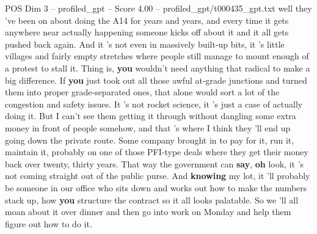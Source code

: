 \begin{textsample}{POS Dim 3 – profiled\_gpt – Score 4.00 – profiled\_gpt/t000435\_gpt.txt}  \label{ex:f3_pos_027}
well they 've been on about doing the A14 for years and years, and every time it gets anywhere near actually happening someone kicks off about it and it all gets pushed back again.
And it ’s not even in massively built‑up bits, it ’s little villages and fairly empty stretches where people still manage to mount enough of a protest to stall it.
Thing is, \textbf{you} wouldn't need anything that radical to make a big difference.
If \textbf{you} just took out all those awful at‑grade junctions and turned them into proper grade‑separated ones, that alone would sort a lot of the congestion and safety issues.
It ’s not rocket science, it ’s just a case of actually doing it.
But I can't see them getting it through without dangling some extra money in front of people somehow, and that ’s where I think they ’ll end up going down the private route.
Some company brought in to pay for it, run it, maintain it, probably on one of those PFI‑type deals where they get their money back over twenty, thirty years.
That way the government can \textbf{say}, \textbf{oh} look, it ’s not coming straight out of the public purse.
And \textbf{knowing} my lot, it ’ll probably be someone in our office who sits down and works out how to make the numbers stack up, how \textbf{you} structure the contract so it all looks palatable.
So we ’ll all moan about it over dinner and then go into work on Monday and help them figure out how to do it.

\end{textsample}
